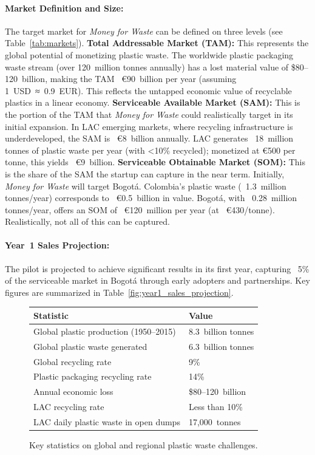\paragraph{Market Definition and Size:} The target market for \textit{Money for Waste} can be defined on three levels (see Table~\ref{tab:markets}). 
\textbf{Total Addressable Market (TAM):} This represents the global potential of monetizing plastic waste. The worldwide plastic packaging waste stream (over 120~million tonnes annually) has a lost material value of \$80--120~billion\autocite{Ezeudu2024}, making the TAM ~€90~billion per year (assuming 1~USD~≈~0.9~EUR). This reflects the untapped economic value of recyclable plastics in a linear economy\autocite{Ezeudu2024}. 
\textbf{Serviceable Available Market (SAM):} This is the portion of the TAM that \textit{Money for Waste} could realistically target in its initial expansion. In LAC emerging markets, where recycling infrastructure is underdeveloped, the SAM is ~€8~billion annually. LAC generates ~18~million tonnes of plastic waste per year (with <10\% recycled)\autocite{UNEP2023}; monetized at €500 per tonne, this yields ~€9~billion. 
\textbf{Serviceable Obtainable Market (SOM):} This is the share of the SAM the startup can capture in the near term. Initially, \textit{Money for Waste} will target Bogotá. Colombia’s plastic waste (~1.3~million tonnes/year) corresponds to ~€0.5~billion in value. Bogotá, with ~0.28~million tonnes/year, offers an SOM of ~€120~million per year (at ~€430/tonne). Realistically, not all of this can be captured.

\paragraph{Year 1 Sales Projection:} The pilot is projected to achieve significant results in its first year, capturing ~5\% of the serviceable market in Bogotá through early adopters and partnerships. Key figures are summarized in Table~\ref{fig:year1_sales_projection}.




\begin{figure}[h!]
    \centering
    \begin{tabular}{|l|l|}
        \hline
        \textbf{Statistic} & \textbf{Value} \\ \hline
        Global plastic production (1950--2015) & 8.3~billion tonnes \\ \hline
        Global plastic waste generated & 6.3~billion tonnes \\ \hline
        Global recycling rate & 9\% \\ \hline
        Plastic packaging recycling rate & 14\% \\ \hline
        Annual economic loss & \$80--120~billion \\ \hline
        LAC recycling rate & Less than 10\% \\ \hline
        LAC daily plastic waste in open dumps & 17,000~tonnes \\ \hline
    \end{tabular}
    \caption{Key statistics on global and regional plastic waste challenges.}
    \label{fig:plastic_waste_stats}
\end{figure}

